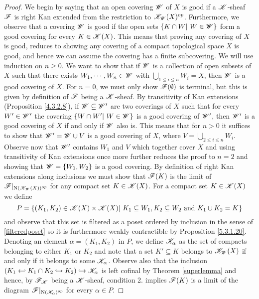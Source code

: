\documentclass[../../thesis.tex]{subfiles}
\begin{document}
\begin{proof}
    We begin by saying that an open covering $\mathscr{W}$ of $X$ is good if a $\mathscr{K}$-sheaf $\mathscr{F}$ is right Kan extended from the restriction to $\mathscr{K}_{\mathscr{W}}(X)^{op}$.
    Furthermore, we observe that a covering $\mathscr{W}$ is good if the open sets $\{K \cap W | W \in \W\}$ form a good covering for every $K\in \mathscr{K}(X)$.
    This means that proving any covering of $X$ is good, reduces to showing any covering of a compact topological space $X$ is good, and hence we can assume the covering has a finite subcovering.
    \newline
    We will use induction on $n \geq 0$.
    We want to show that if $\mathscr{W}$ is a collection of open subsets of $X$ such that there exists $W_1, \cdots ,W_n \in \mathscr{W}$ with $\bigcup_{1 \leq i \leq n}W_i = X$, then $\mathscr{W}$ is a good covering of $X$.
    For $n=0$, we must only show $\mathscr{F}(\emptyset)$ is terminal, but this is given by definition of $\mathscr{F}$ being a $\mathscr{K}$-sheaf.
    \newline
    By transitivity of Kan extensions (Proposition \ref{4.3.2.8}), if $\mathscr{W} \subseteq \mathscr{W}'$ are two coverings of $X$ such that for every $W' \in \mathscr{W}'$ the covering $\{ W \cap W' | W \in \W\}$ is a good covering of $\mathscr{W}'$, then $\mathscr{W}'$ is a good covering of $X$ if and only if $\mathscr{W}$ also is.
    \newline
    This means that for $n>0$ it suffices to show that $\mathscr{W}' = \mathscr{W} \cup V$ is a good covering of $X$, where $V = \bigcup_{2 \leq i \leq n}W_i$.
    Observe now that $\mathscr{W}'$ contains $W_1$ and $V$ which together cover $X$ and using transitivity of Kan extensions once more further reduces the proof to $n = 2$ and showing that $\mathscr{W} = \{W_1, W_2\}$ is a good covering.
    \newline
    By definition of right Kan extensions along inclusions we must show that $\mathscr{F}(K)$ is the limit of $\mathscr{F}|_{\mathrm{N}(\mathscr{K}_{\mathscr{W}}(X))^{op}}$ for any compact set $K \in \mathscr{K}(X)$.
    For a compact set $K\in \mathscr{K}(X)$ we define
    \[
        P = \{(K_1, K_2) \in \K(X)\times \K(X) | K_1 \subseteq W_1, K_2 \subseteq W_2 \text{ and } K_1 \cup K_2 = K\}
    \]
    and observe that this set is filtered as a poset ordered by inclusion in the sense of \ref{filteredposet} so it is furthermore weakly contractible by Proposition \ref{5.3.1.20}.
    Denoting an element $\alpha = (K_1, K_2)$ in $P$, we define $\mathscr{K}_{\alpha}$ as the set of compacts belonging to either $K_1$ or $K_2$ and note that a set $K' \subseteq K$ belongs to $\mathscr{K}_{\mathscr{W}}(X)$ if and only if it belongs to some $\mathscr{K}_{\alpha}$.
    Observe also that the inclusion $(K_1 \hookleftarrow K_1 \cap K_2 \hookrightarrow K_2 ) \hookrightarrow \mathscr{K}_{\alpha}$ is left cofinal by Theorem \ref{superlemma} and hence, by $\mathscr{F}_{\mathscr{K}}$ being a $\mathscr{K}$-sheaf, condition 2. implies $\mathscr{F}(K)$ is a limit of the diagram $\mathscr{F}|_{\mathrm{N}(\mathscr{K}_{\alpha})^{op}}$ for every $\alpha \in P$.

\end{proof}
\end{document}
